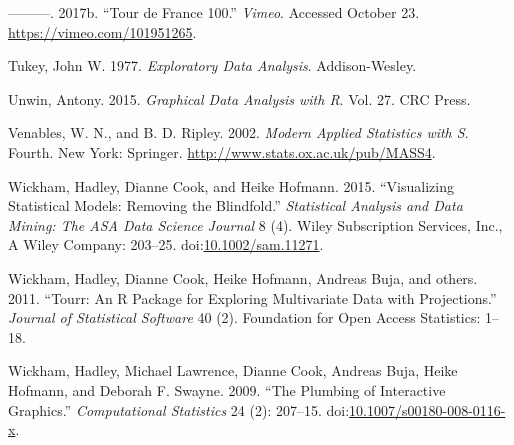 \documentclass[]{book}
\theoremstyle{definition}
\theoremstyle{definition}
\theoremstyle{definition}
\theoremstyle{remark}
\begin{document}
\hypertarget{ref-tourdefrance}{}
---------. 2017b. ``Tour de France 100.'' \emph{Vimeo}. Accessed October
23. \url{https://vimeo.com/101951265}.

\hypertarget{ref-EDA}{}
Tukey, John W. 1977. \emph{Exploratory Data Analysis}. Addison-Wesley.

\hypertarget{ref-GDA}{}
Unwin, Antony. 2015. \emph{Graphical Data Analysis with R}. Vol. 27. CRC
Press.

\hypertarget{ref-Mass}{}
Venables, W. N., and B. D. Ripley. 2002. \emph{Modern Applied Statistics
with S}. Fourth. New York: Springer.
\url{http://www.stats.ox.ac.uk/pub/MASS4}.

\hypertarget{ref-blindfold}{}
Wickham, Hadley, Dianne Cook, and Heike Hofmann. 2015. ``Visualizing
Statistical Models: Removing the Blindfold.'' \emph{Statistical Analysis
and Data Mining: The ASA Data Science Journal} 8 (4). Wiley Subscription
Services, Inc., A Wiley Company: 203--25.
doi:\href{https://doi.org/10.1002/sam.11271}{10.1002/sam.11271}.

\hypertarget{ref-tourr}{}
Wickham, Hadley, Dianne Cook, Heike Hofmann, Andreas Buja, and others.
2011. ``Tourr: An R Package for Exploring Multivariate Data with
Projections.'' \emph{Journal of Statistical Software} 40 (2). Foundation
for Open Access Statistics: 1--18.

\hypertarget{ref-pipe}{}
Wickham, Hadley, Michael Lawrence, Dianne Cook, Andreas Buja, Heike
Hofmann, and Deborah F. Swayne. 2009. ``The Plumbing of Interactive
Graphics.'' \emph{Computational Statistics} 24 (2): 207--15.
doi:\href{https://doi.org/10.1007/s00180-008-0116-x}{10.1007/s00180-008-0116-x}.
\end{document}
